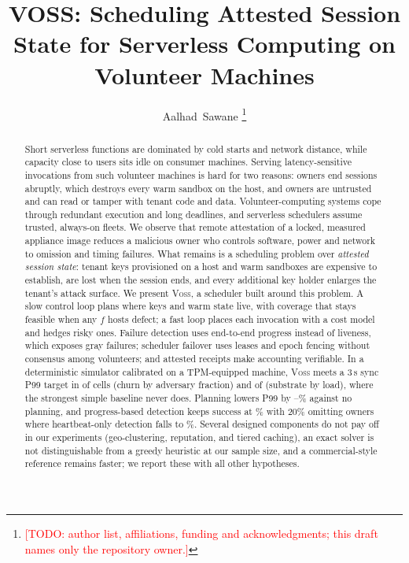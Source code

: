\documentclass[journal]{IEEEtran}
\newcommand{\voss}{\textsc{Voss}}
\newcommand{\todo}[1]{\textcolor{red}{[TODO: #1]}}
\begin{document}
\title{VOSS: Scheduling Attested Session State for Serverless Computing on Volunteer Machines}

\author{Aalhad~Sawane%
\thanks{\todo{author list, affiliations, funding and acknowledgments; this draft names only the repository owner.}}}


\maketitle

\begin{abstract}
Short serverless functions are dominated by cold starts and network distance, while capacity close to users sits idle on
consumer machines. Serving latency-sensitive invocations from such volunteer machines is hard for two reasons: owners end
sessions abruptly, which destroys every warm sandbox on the host, and owners are untrusted and can read or tamper with
tenant code and data. Volunteer-computing systems cope through redundant execution and long deadlines, and serverless
schedulers assume trusted, always-on fleets. We observe that remote attestation of a locked, measured appliance image
reduces a malicious owner who controls software, power and network to omission and timing failures. What remains is a scheduling problem over \emph{attested
session state}: tenant keys provisioned on a host and warm sandboxes are expensive to establish, are lost when the session
ends, and every additional key holder enlarges the tenant's attack surface. We present \voss{}, a scheduler built around
this problem. A slow control loop plans where keys and warm state live, with coverage that stays feasible when any $f$
hosts defect; a fast loop places each invocation with a cost model and hedges risky ones. Failure detection uses
end-to-end progress instead of liveness, which exposes gray failures; scheduler failover uses leases and epoch
fencing without consensus among volunteers; and attested receipts make accounting verifiable. In a deterministic simulator
calibrated on a TPM-equipped machine, \voss{} meets a 3\,s sync P99 target in \ViabAPThreeVoss{} of \ViabACells{} cells (churn by adversary fraction) and
\ViabBPThreeVoss{} of \ViabBCells{} (substrate by load), where the strongest simple baseline never does.
Planning lowers P99 by \GreedyNoneMed--\GreedyNoneHigh\% against no planning, and progress-based detection keeps success
at \VossSuccAlpha\% with 20\% omitting owners where heartbeat-only detection falls to \HbSuccAlpha\%. Several designed
components do not pay off in our experiments (geo-clustering, reputation, and tiered caching), an exact solver is not
distinguishable from a greedy heuristic at our sample size, and a commercial-style reference remains faster; we report these with all other hypotheses.
\end{abstract}
\end{document}
